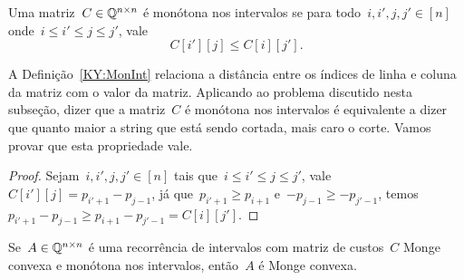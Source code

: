 \begin{defi} \label{KY:MonInt}
Uma matriz~$C \in \mathbb{Q}^{n \times n}$ é monótona nos intervalos se para todo~$i,i',j,j' \in [n]$ onde~$i \leq i' \leq j \leq j'$, vale
$$C[i'][j] \leq C[i][j'] \text{.}$$
\end{defi}

A Definição~\ref{KY:MonInt} relaciona a distância entre os índices de linha e coluna da matriz com o valor da matriz. Aplicando ao problema discutido nesta subseção, dizer que a matriz~$C$ é monótona nos intervalos é equivalente a dizer que quanto maior a string que está sendo cortada, mais caro o corte. Vamos provar que esta propriedade vale.

\begin{proof}
Sejam~$i,i',j,j' \in [n]$ tais que~$i \leq i' \leq j \leq j'$, vale~$C[i'][j] = p_{i'+1} - p_{j-1}$, já que~${p_{i'+1} \geq p_{i+1}}$ e~${-p_{j-1} \geq -p_{j'-1}}$, temos~$p_{i'+1} - p_{j-1} \geq p_{i+1} - p_{j'-1} = C[i][j']$.
\end{proof}

\begin{lema} \label{KY:CtoA}
Se~$A \in \mathbb{Q}^{n \times n}$ é uma recorrência de intervalos com matriz de custos~$C$ Monge convexa e monótona nos intervalos, então~$A$ é Monge convexa.
\end{lema}

